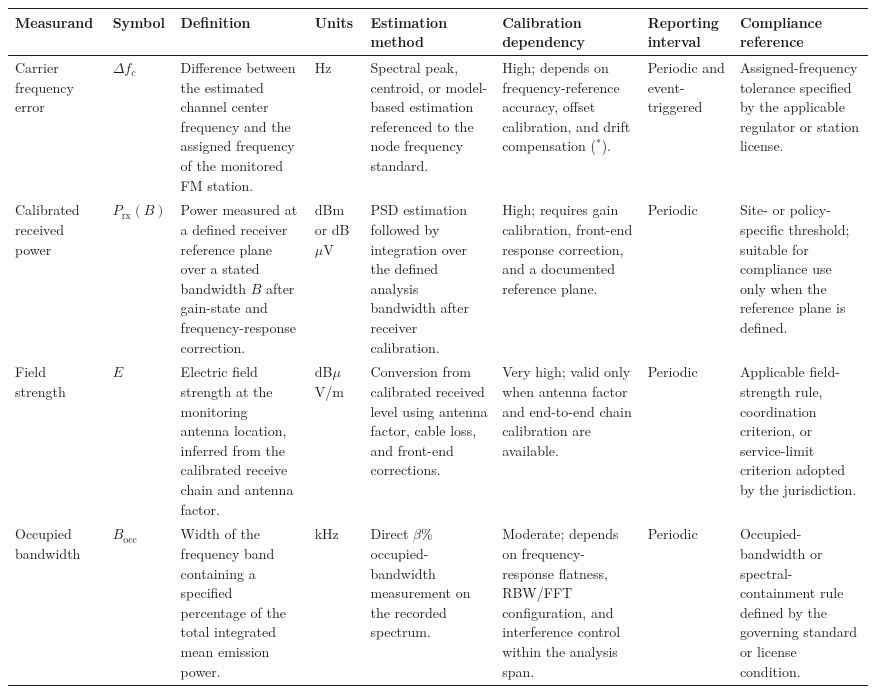 \begin{table}
	\centering
	\footnotesize
	\setlength{\tabcolsep}{5pt}
	\renewcommand{\arraystretch}{1.25}
	\begin{tabular}{p{2.1cm} p{0.9cm} p{4.2cm} p{1.2cm} p{3.9cm} p{3.3cm} p{1.8cm} p{3.9cm}}
		\hline
		\textbf{Measurand} & \textbf{Symbol} & \textbf{Definition} & \textbf{Units} & \textbf{Estimation method} & \textbf{Calibration dependency} & \textbf{Reporting interval} & \textbf{Compliance reference} \\
		\hline
		
		Carrier frequency error
		& $\Delta f_c$
		& Difference between the estimated channel center frequency and the assigned frequency of the monitored FM station.
		& Hz
		& Spectral peak, centroid, or model-based estimation referenced to the node frequency standard.
		& High; depends on frequency-reference accuracy, offset calibration, and drift compensation ($^{*}$).
		& Periodic and event-triggered
		& Assigned-frequency tolerance specified by the applicable regulator or station license. \\
		
		Calibrated received power
		& $P_{\mathrm{rx}}(B)$
		& Power measured at a defined receiver reference plane over a stated bandwidth $B$ after gain-state and frequency-response correction.
		& dBm or dB$\mu$V
		& PSD estimation followed by integration over the defined analysis bandwidth after receiver calibration.
		& High; requires gain calibration, front-end response correction, and a documented reference plane.
		& Periodic
		& Site- or policy-specific threshold; suitable for compliance use only when the reference plane is defined. \\
		
		Field strength
		& $E$
		& Electric field strength at the monitoring antenna location, inferred from the calibrated receive chain and antenna factor.
		& dB$\mu$V/m
		& Conversion from calibrated received level using antenna factor, cable loss, and front-end corrections.
		& Very high; valid only when antenna factor and end-to-end chain calibration are available.
		& Periodic
		& Applicable field-strength rule, coordination criterion, or service-limit criterion adopted by the jurisdiction. \\
		
		Occupied bandwidth
		& $B_{\mathrm{occ}}$
		& Width of the frequency band containing a specified percentage of the total integrated mean emission power.
		& kHz
		& Direct $\beta\%$ occupied-bandwidth measurement on the recorded spectrum.
		& Moderate; depends on frequency-response flatness, RBW/FFT configuration, and interference control within the analysis span.
		& Periodic
		& Occupied-bandwidth or spectral-containment rule defined by the governing standard or license condition. \\
		

\end{tabular}
\end{table}
